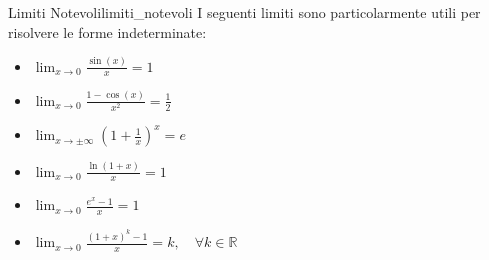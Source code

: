 \begin{theorem}{Limiti Notevoli}{limiti_notevoli}
    I seguenti limiti sono particolarmente utili per risolvere le forme indeterminate:
    \begin{itemize}
        \item $\lim_{x \to 0} \frac{\sin(x)}{x} = 1$
        \item $\lim_{x \to 0} \frac{1 - \cos(x)}{x^2} = \frac{1}{2}$
        \item $\lim_{x \to \pm\infty} \left(1 + \frac{1}{x}\right)^x = e$
        \item $\lim_{x \to 0} \frac{\ln(1+x)}{x} = 1$
        \item $\lim_{x \to 0} \frac{e^x - 1}{x} = 1$
        \item $\lim_{x \to 0} \frac{(1+x)^k - 1}{x} = k, \quad \forall k \in \mathbb{R}$
    \end{itemize}
\end{theorem}